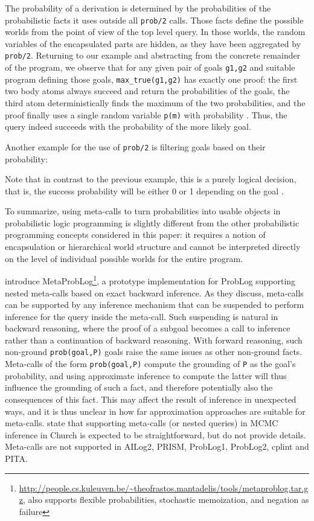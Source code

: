 \documentclass[a4paper]{article}
\begin{document}
The probability of a derivation is determined by the probabilities of
the probabilistic facts it uses outside all \verb|prob/2| calls. Those
facts define the possible worlds from the point of view of the top
level query. In those worlds, the random variables of the encapsulated
parts are hidden, as they have been aggregated by
\verb|prob/2|. Returning to our example and abstracting from the
concrete remainder of the program, we observe that for any given pair of goals \verb|g1,g2| and suitable program defining those goals, \verb|max_true(g1,g2)| has exactly one proof: the first two body atoms always succeed and return the probabilities of the goals, the third atom deterministically finds the maximum  of the two probabilities,  and the proof finally uses a single random variable \verb|p(m)| with probability . Thus, the query indeed  succeeds with the probability of the more likely goal. 

Another example for the use of \verb|prob/2| is filtering goals based on their probability:

Note that in contrast to the previous example, this is a purely logical decision, that is, the success probability will be either 0 or 1 depending on the goal .



To summarize, using meta-calls to turn probabilities into usable
objects in probabilistic logic programming is slightly different from the other probabilistic programming concepts considered in this paper: it requires a notion of encapsulation or hierarchical world structure and cannot be interpreted directly on the level of individual possible worlds for the entire program. 

\citet{Mantadelis11}  introduce
MetaProbLog\footnote{\url{http://people.cs.kuleuven.be/~theofrastos.mantadelis/tools/metaproblog.tar.gz},
also supports flexible probabilities, stochastic memoization, and negation
as failure}, a prototype implementation for ProbLog supporting nested meta-calls based on
exact backward inference. As
they discuss, meta-calls
can be supported by any inference 
mechanism that can be suspended to perform inference for the query
inside the meta-call. Such suspending is natural in backward
reasoning, where the proof of a subgoal becomes a call to inference rather
than a continuation of backward reasoning. With forward reasoning,
such non-ground \verb|prob(goal,P)| goals raise the same issues as
other non-ground facts. 
Meta-calls of the form
\verb|prob(goal,P)| 
compute the grounding of \verb|P| as the goal's probability, and using
approximate inference to compute the latter will thus influence the grounding of
such a fact, and therefore potentially also the consequences of this
fact. This may affect the result of inference in unexpected ways, and
it is thus unclear in how far approximation approaches
are suitable for meta-calls.
\cite{Goodman08} state that supporting
meta-calls (or nested queries) in MCMC inference in Church is expected
to be straightforward, but do not provide details.  
Meta-calls are not
supported in AILog2, PRISM, ProbLog1, ProbLog2, cplint and PITA.
\end{document}
